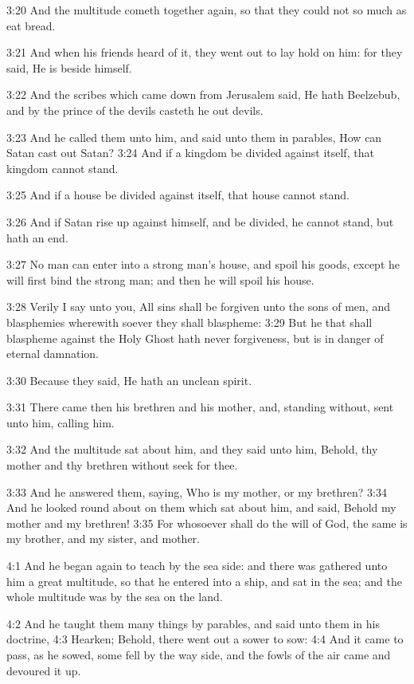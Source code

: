 3:20 And the multitude cometh together again, so that they could not
so much as eat bread.

3:21 And when his friends heard of it, they went out to lay hold on
him: for they said, He is beside himself.

3:22 And the scribes which came down from Jerusalem said, He hath
Beelzebub, and by the prince of the devils casteth he out devils.

3:23 And he called them unto him, and said unto them in parables, How
can Satan cast out Satan?  3:24 And if a kingdom be divided against
itself, that kingdom cannot stand.

3:25 And if a house be divided against itself, that house cannot
stand.

3:26 And if Satan rise up against himself, and be divided, he cannot
stand, but hath an end.

3:27 No man can enter into a strong man's house, and spoil his goods,
except he will first bind the strong man; and then he will spoil his
house.

3:28 Verily I say unto you, All sins shall be forgiven unto the sons
of men, and blasphemies wherewith soever they shall blaspheme: 3:29
But he that shall blaspheme against the Holy Ghost hath never
forgiveness, but is in danger of eternal damnation.

3:30 Because they said, He hath an unclean spirit.

3:31 There came then his brethren and his mother, and, standing
without, sent unto him, calling him.

3:32 And the multitude sat about him, and they said unto him, Behold,
thy mother and thy brethren without seek for thee.

3:33 And he answered them, saying, Who is my mother, or my brethren?
3:34 And he looked round about on them which sat about him, and said,
Behold my mother and my brethren!  3:35 For whosoever shall do the
will of God, the same is my brother, and my sister, and mother.

4:1 And he began again to teach by the sea side: and there was
gathered unto him a great multitude, so that he entered into a ship,
and sat in the sea; and the whole multitude was by the sea on the
land.

4:2 And he taught them many things by parables, and said unto them in
his doctrine, 4:3 Hearken; Behold, there went out a sower to sow: 4:4
And it came to pass, as he sowed, some fell by the way side, and the
fowls of the air came and devoured it up.

